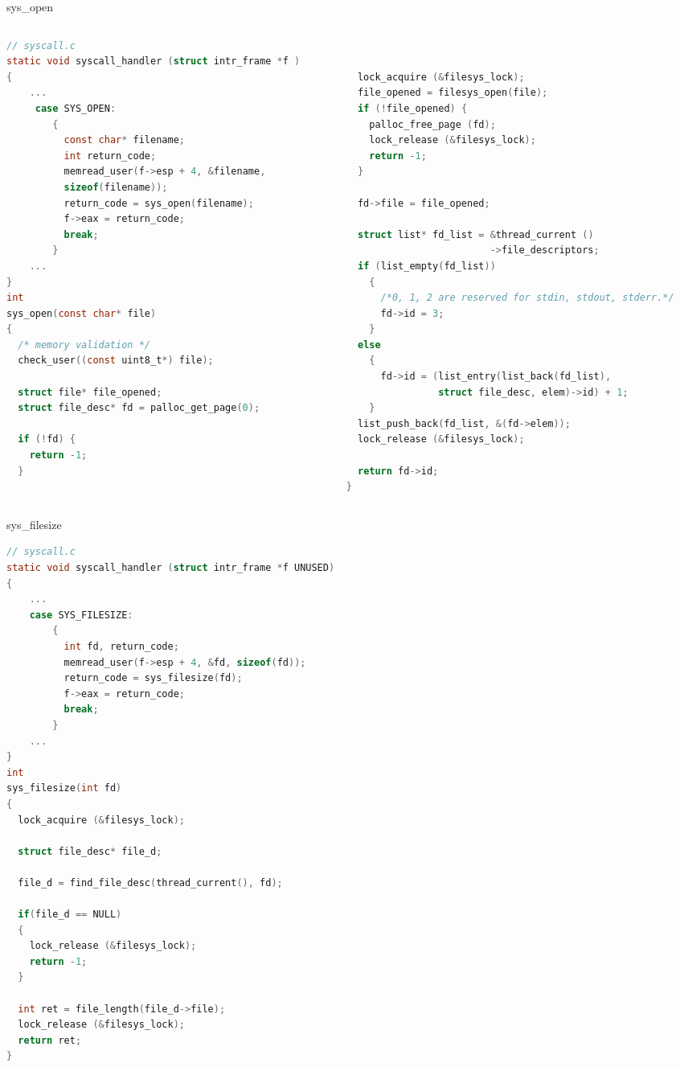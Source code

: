 \documentclass[10pt]{beamer}
\begin{document}
\begin{frame}[fragile]{sys\_open}
\begin{columns}
\begin{column}{0.5\textwidth}
\begin{lstlisting}[language=C]
// syscall.c
static void syscall_handler (struct intr_frame *f ) 
{
    ...
     case SYS_OPEN:
        {
          const char* filename;
          int return_code;
          memread_user(f->esp + 4, &filename,
          sizeof(filename));
          return_code = sys_open(filename);
          f->eax = return_code;
          break;
        }
    ...
}
int 
sys_open(const char* file) 
{
  /* memory validation */
  check_user((const uint8_t*) file);
  
  struct file* file_opened;
  struct file_desc* fd = palloc_get_page(0);

  if (!fd) {
    return -1;
  }
\end{lstlisting}
\end{column}
\begin{column}{0.5\textwidth}
\begin{lstlisting}[language=C]


  lock_acquire (&filesys_lock);
  file_opened = filesys_open(file);
  if (!file_opened) {
    palloc_free_page (fd);
    lock_release (&filesys_lock);
    return -1;
  }

  fd->file = file_opened;

  struct list* fd_list = &thread_current ()
                         ->file_descriptors;
  if (list_empty(fd_list)) 
    {
      /*0, 1, 2 are reserved for stdin, stdout, stderr.*/
      fd->id = 3;
    }
  else 
    {
      fd->id = (list_entry(list_back(fd_list), 
                struct file_desc, elem)->id) + 1;
    }
  list_push_back(fd_list, &(fd->elem));
  lock_release (&filesys_lock);

  return fd->id;
}
\end{lstlisting}
\end{column}
\end{columns}
\end{frame}
\begin{frame}[fragile]{sys\_filesize}
    \begin{lstlisting}[language=C]
// syscall.c
static void syscall_handler (struct intr_frame *f UNUSED) 
{
    ...
    case SYS_FILESIZE:
        {
          int fd, return_code;
          memread_user(f->esp + 4, &fd, sizeof(fd));
          return_code = sys_filesize(fd);
          f->eax = return_code;
          break;
        }
    ...
}
int 
sys_filesize(int fd) 
{
  lock_acquire (&filesys_lock);

  struct file_desc* file_d;

  file_d = find_file_desc(thread_current(), fd);

  if(file_d == NULL) 
  {
    lock_release (&filesys_lock);
    return -1;
  }

  int ret = file_length(file_d->file);
  lock_release (&filesys_lock);
  return ret;
}
    \end{lstlisting}
\end{frame}
\end{document}

